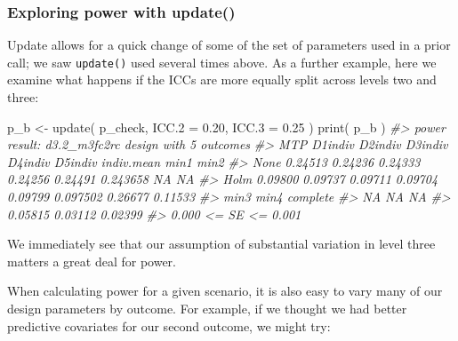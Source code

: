 \documentclass[
]{article}
\newenvironment{Shaded}{\begin{snugshade}}{\end{snugshade}}
\newcommand{\AttributeTok}[1]{\textcolor[rgb]{0.77,0.63,0.00}{#1}}
\newcommand{\CommentTok}[1]{\textcolor[rgb]{0.56,0.35,0.01}{\textit{#1}}}
\newcommand{\FloatTok}[1]{\textcolor[rgb]{0.00,0.00,0.81}{#1}}
\newcommand{\FunctionTok}[1]{\textcolor[rgb]{0.00,0.00,0.00}{#1}}
\newcommand{\NormalTok}[1]{#1}
\newcommand{\OtherTok}[1]{\textcolor[rgb]{0.56,0.35,0.01}{#1}}
\begin{document}
\subsubsection{Exploring power with update()}

Update allows for a quick change of some of the set of parameters used
in a prior call; we saw \texttt{update()} used several times above. As a
further example, here we examine what happens if the ICCs are more
equally split across levels two and three:

\begin{Shaded}
\begin{Highlighting}[]
\NormalTok{p\_b }\OtherTok{\textless{}{-}} \FunctionTok{update}\NormalTok{( p\_check, }\AttributeTok{ICC.2 =} \FloatTok{0.20}\NormalTok{, }\AttributeTok{ICC.3 =} \FloatTok{0.25}\NormalTok{ )}
\FunctionTok{print}\NormalTok{( p\_b )}
\CommentTok{\#\textgreater{} power result: d3.2\_m3fc2rc design with 5 outcomes}
\CommentTok{\#\textgreater{}   MTP D1indiv D2indiv D3indiv D4indiv D5indiv indiv.mean    min1    min2}
\CommentTok{\#\textgreater{}  None 0.24513 0.24236 0.24333 0.24256 0.24491   0.243658      NA      NA}
\CommentTok{\#\textgreater{}  Holm 0.09800 0.09737 0.09711 0.09704 0.09799   0.097502 0.26677 0.11533}
\CommentTok{\#\textgreater{}     min3    min4 complete}
\CommentTok{\#\textgreater{}       NA      NA       NA}
\CommentTok{\#\textgreater{}  0.05815 0.03112  0.02399}
\CommentTok{\#\textgreater{}  0.000 \textless{}= SE \textless{}= 0.001}
\end{Highlighting}
\end{Shaded}

We immediately see that our assumption of substantial variation in level
three matters a great deal for power.

When calculating power for a given scenario, it is also easy to vary
many of our design parameters by outcome. For example, if we thought we
had better predictive covariates for our second outcome, we might try:
\end{document}
